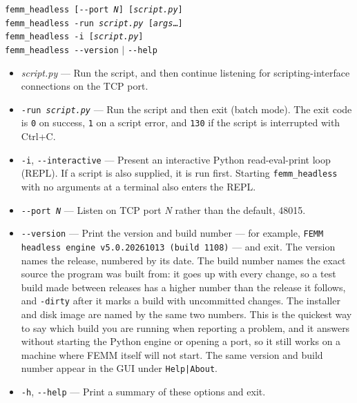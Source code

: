 \documentclass[12pt]{report}
\begin{document}
\vspace{1ex}
 \texttt{femm\_headless [-{}-port {\itshape N}] [{\itshape script.py}]}\\
\texttt{femm\_headless -run {\itshape script.py} [{\itshape args}\ldots]}\\
\texttt{femm\_headless -i [{\itshape script.py}]}\\
\texttt{femm\_headless -{}-version} $|$ \texttt{-{}-help}

\begin{itemize}
\item{\itshape script.py} --- Run the script, and then continue listening for
scripting-interface connections on the TCP port.

\item\texttt{-run {\itshape script.py}} --- Run the script and then exit (batch
mode).  The exit code is {\tt 0} on success, {\tt 1} on a script error, and
{\tt 130} if the script is interrupted with Ctrl+C.

\item\texttt{-i}, \texttt{-{}-interactive} --- Present an interactive Python
read-eval-print loop (REPL).  If a script is also supplied, it is run first.
Starting {\tt femm\_headless} with no arguments at a terminal also enters the
REPL.

\item\texttt{-{}-port {\itshape N}} --- Listen on TCP port {\itshape N} rather
than the default, 48015.

\item\texttt{-{}-version} --- Print the version and build number --- for
example, {\tt FEMM headless engine v5.0.20261013 (build 1108)} --- and exit.
The version names the release, numbered by its date.  The build number names
the exact source the program was built from: it goes up with every change, so
a test build made between releases has a higher number than the release it
follows, and {\tt -dirty} after it marks a build with uncommitted changes.  The
installer and disk image are named by the same two numbers.  This is the quickest
way to say which build you are running when reporting a problem, and it answers
without starting the Python engine or opening a port, so it still works on a
machine where FEMM itself will not start.  The same version and build number appear in
the GUI under {\tt Help|About}.

\item\texttt{-h}, \texttt{-{}-help} --- Print a summary of these options and
exit.
\end{itemize}
\end{document}
